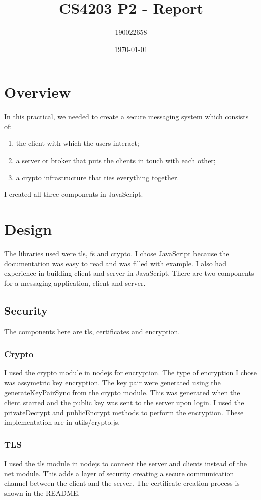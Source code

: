 \documentclass[11pt]{article}
\author{190022658}
\date{\today}
\title{CS4203 P2 - Report}
\begin{document}
\maketitle

\section{Overview}
\label{sec:org4fcbab9}
In this practical, we needed to create a secure messaging system which consists of:
\begin{enumerate}
\item the client with which the users interact;
\item a server or broker that puts the clients in touch with each other;
\item a crypto infrastructure that ties everything together.
\end{enumerate}

I created all three components in JavaScript.

\section{Design}
\label{sec:orgea76752}
The libraries used were tls, fs and crypto. I chose JavaScript because the documentation was easy to read and was filled with example. I also had experience in building client and server in JavaScript.
There are two components for a messaging application, client and server.
\subsection{Security}
\label{sec:org0d77502}
The components here are tls, certificates and encryption.
\subsubsection{Crypto}
\label{sec:org9b86112}
I used the crypto module in nodejs for encryption. The type of encryption I chose was assymetric key encryption. The key pair were generated using the generateKeyPairSync from the crypto module. This was generated when the client started and the public key was sent to the server upon login. I used the privateDecrypt and publicEncrypt methods to perform the encryption. These implementation are in utils/crypto.js.
\subsubsection{TLS}
\label{sec:orgccbdd95}
I used the tls module in nodejs to connect the server and clients instead of the net module. This adds a layer of security creating a secure communication channel between the client and the server. The certificate creation process is shown in the README.
\end{document}
